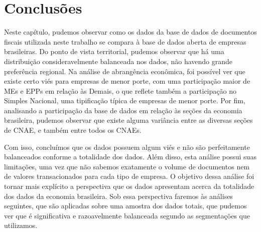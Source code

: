 \section{Conclusões}

Neste capítulo, pudemos observar como os dados da base de dados de documentos fiscais utilizada neste trabalho se compara à base de dados aberta de empresas brasileiras. Do ponto de vista territorial, pudemos observar que há uma distribuição consideravelmente balanceada nos dados, não havendo grande preferência regional. Na análise de abrangência econômica, foi possível ver que existe certo viés para empresas de menor porte, com uma participação maior de MEs e EPPs em relação às Demais, o que reflete também a participação no Simples Nacional, uma tipificação típica de empresas de menor porte. Por fim, analisando a participação da base de dados em relação às seções da economia brasileira, pudemos observar que existe alguma variância entre as diversas seções de CNAE, e também entre todos os CNAEs.

Com isso, concluímos que os dados possuem algum viés e não são perfeitamente balanceados conforme a totalidade dos dados. Além disso, esta análise possui suas limitações, uma vez que não sabemos exatamente o volume de documentos nem de valores transacionados para cada tipo de empresa. O objetivo dessa análise foi tornar mais explícito a perspectiva que os dados apresentam acerca da totalidade dos dados da economia brasileira. Sob essa perspectiva faremos às análises seguintes, que são aplicadas sobre uma amostra dos dados totais, que pudemos ver que é significativa e razoavelmente balanceada segundo as segmentações que utilizamos.
